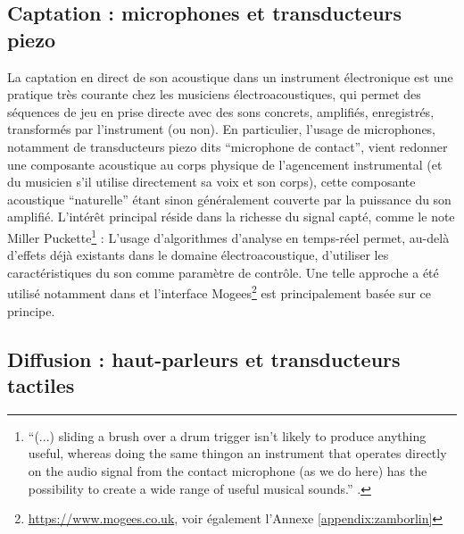 \subsection{Captation : microphones et transducteurs piezo}

\noindent La captation en direct de son acoustique dans un instrument électronique est une pratique très courante chez les musiciens électroacoustiques, qui permet des séquences de jeu en prise directe avec des sons concrets, amplifiés, enregistrés, transformés par l'instrument (ou non). En particulier, l'usage de microphones, notamment de transducteurs piezo dits ``microphone de contact'', vient redonner une composante acoustique au corps physique de l'agencement instrumental (et du musicien s'il utilise directement sa voix et son corps), cette composante acoustique ``naturelle'' étant sinon généralement couverte par la puissance du son amplifié. L'intérêt principal réside dans la richesse du signal capté, comme le note Miller Puckette\footnote{``(...) sliding a brush over a drum trigger isn’t likely to produce  anything  useful,  whereas  doing  the  same  thingon an instrument that operates directly on the audio signal from the contact microphone (as we do here) has the possibility to create a wide range of useful musical sounds.'' \cite{puckette_infuriating_2011}.} :  L'usage d'algorithmes d'analyse en temps-réel permet, au-delà d'effets déjà existants dans le domaine électroacoustique, d'utiliser les caractéristiques du son comme paramètre de contrôle. Une telle approche a été utilisé notamment dans \cite{schwarz_rich_2014} et l'interface Mogees\footnote{\url{https://www.mogees.co.uk}, voir également l'Annexe \ref{appendix:zamborlin}} est principalement basée sur ce principe. 


\subsection{Diffusion : haut-parleurs et transducteurs tactiles}

